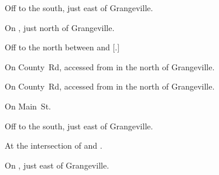 
\begin{LocationList}

Off  to the south, just east of Grangeville.

On , just north of Grangeville.

Off  to the north between  and [.]

On County~Rd, accessed from  in the north of Grangeville.

On County~Rd, accessed from  in the north of Grangeville.

On  Main~St.

Off  to the south, just east of Grangeville.

\Location{\TruckStop \Gas \Rest}
At the intersection of  and .

On , just east of Grangeville.

\end{LocationList}
